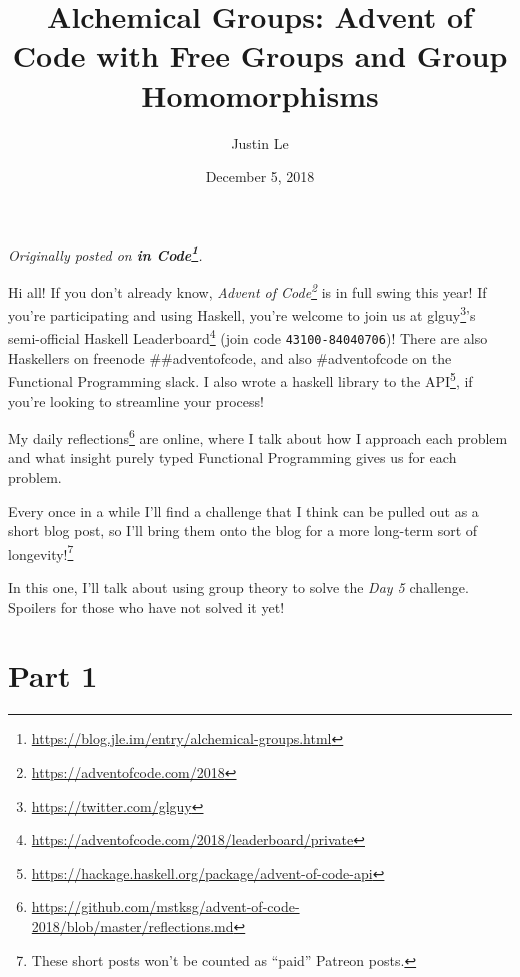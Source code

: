 \documentclass[]{article}
\title{Alchemical Groups: Advent of Code with Free Groups and Group Homomorphisms}
\author{Justin Le}
\date{December 5, 2018}
\renewcommand{\href}[2]{#2\footnote{\url{#1}}}
\begin{document}
\maketitle

\emph{Originally posted on
\textbf{\href{https://blog.jle.im/entry/alchemical-groups.html}{in Code}}.}

Hi all! If you don't already know,
\emph{\href{https://adventofcode.com/2018}{Advent of Code}} is in full swing
this year! If you're participating and using Haskell, you're welcome to join us
at \href{https://twitter.com/glguy}{glguy}'s semi-official
\href{https://adventofcode.com/2018/leaderboard/private}{Haskell Leaderboard}
(join code \texttt{43100-84040706})! There are also Haskellers on freenode
\#\#adventofcode, and also \#adventofcode on the Functional Programming slack. I
also wrote a
\href{https://hackage.haskell.org/package/advent-of-code-api}{haskell library to
the API}, if you're looking to streamline your process!

My
\href{https://github.com/mstksg/advent-of-code-2018/blob/master/reflections.md}{daily
reflections} are online, where I talk about how I approach each problem and what
insight purely typed Functional Programming gives us for each problem.

Every once in a while I'll find a challenge that I think can be pulled out as a
short blog post, so I'll bring them onto the blog for a more long-term sort of
longevity!\footnote{These short posts won't be counted as ``paid'' Patreon
  posts.}

In this one, I'll talk about using group theory to solve the \emph{Day 5}
challenge. Spoilers for those who have not solved it yet!

\hypertarget{part-1}{%
\section{Part 1}\label{part-1}}
\end{document}

